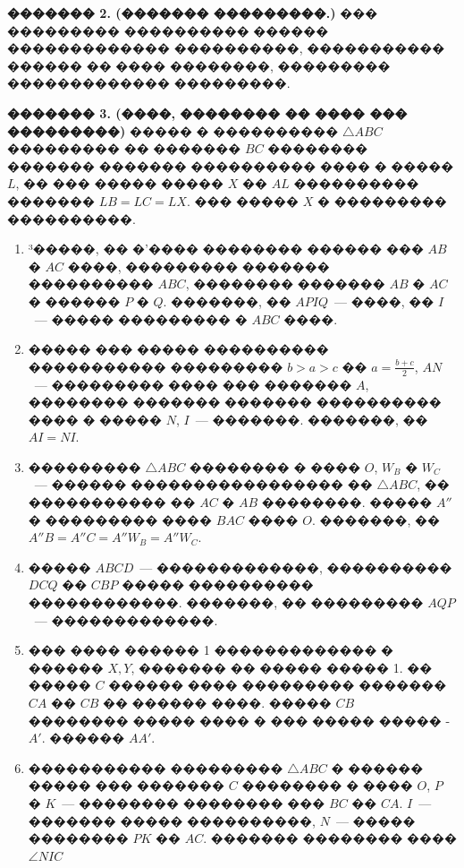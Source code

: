 \documentclass[a4paper,12pt]{article}
\begin{document}
\textbf{������� 2. (������� ���������.)} ��� ��������� ���������� ������ ������������� ����������, ����������� ������ �� ���� ��������, ��������� ������������� ���������.

\textbf{������� 3. (����, �������� �� ���� ��� ���������)} ����� � ���������� $\triangle ABC$ ��������� �� ������� $BC$ �������� ������� ������� ���������� ���� � ����� $L$, �� ��� ����� ����� $X$ �� $AL$ ���������� ������� $LB=LC=LX$. ��� ����� $X$ � ��������� ����������.

\medskip\medskip\medskip

\begin{enumerate}
 \item ³�����, �� �'���� �������� ������ ��� $AB$ � $AC$ ����, ��������� ������� ���������� $ABC$, �������� ������� $AB$ � $AC$ � ������ $P$ � $Q$. �������, �� $APIQ$~--- ����, �� $I$~--- ����� ��������� � $ABC$ ����.

\item ����� ��� ����� ���������� ����������� ��������� $b>a>c$ �� $a=\frac{b+c}{2}$, $AN$~--- ��������� ���� ��� ������� $A$, �������� ������� ������� ���������� ���� � ����� $N$, $I$~--- �������. �������, �� $AI=NI$.

\item ��������� $\triangle ABC$ �������� � ���� $O$, $W_{B}$ � $W_{C}$~--- ������ ����������������� �� $\triangle ABC$, �� ����������� �� $AC$ � $AB$ ��������. ����� $A''$ � ��������� ���� $BAC$ ���� $O$. �������, �� $A''B=A''C=A''W_{B}=A''W_{C}$.

\item ����� $ABCD$~--- �������������, ���������� $DCQ$ �� $CBP$ ����� ���������� ������������. �������, �� ��������� $AQP$~--- �������������.

\item ��� ���� ������ 1 ������������� � ������ $X, Y$, ������� �� ����� ����� 1. �� ����� $C$ ������ ���� ��������� ������� $CA$ �� $CB$ �� ������ ����. ����� $CB$ �������� ����� ���� � ��� ����� ����� - $A'$. ������ $AA'$.

\item ����������� ��������� $\triangle ABC$ � ������ ����� ��� ������� $C$ �������� � ���� $O$, $P$ � $K$~--- �������� �������� ��� $BC$ �� $CA$. $I$~--- ������� ����� ����������, $N$~--- ����� �������� $PK$ �� $AC$. ������� �������� ���� $\angle NIC$
\end{enumerate}
\end{document}
